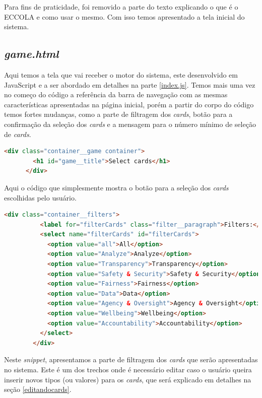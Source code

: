 Para fins de praticidade, foi removido a parte do texto explicando o que é o ECCOLA e como usar o mesmo. Com isso temos apresentado a tela inicial do sistema.

\subsection{\textit{game.html}}
\label{game.html}
Aqui temos a tela que vai receber o motor do sistema, este desenvolvido em JavaScript e a ser abordado em detalhes na parte \ref{index.js}. Temos mais uma vez no começo do código a referência da barra de navegação com as mesmas características apresentadas na página inicial, porém a partir do corpo do código temos fortes mudanças, como a parte de filtragem dos \textit{cards}, botão para a confirmação da seleção dos \textit{cards} e a mensagem para o número mínimo de seleção de \textit{cards}.

\begin{lstlisting}[language=html, caption=Seleção dos \textit{cards}.]
      <div class="container__game container">
        <h1 id="game__title">Select cards</h1>
      </div>
\end{lstlisting}
Aqui o código que simplesmente mostra o botão para a seleção dos \textit{cards} escolhidas pelo usuário.

\begin{lstlisting}[language=html, caption=Filtro dos \textit{cards}.]
        <div class="container__filters">
          <label for="filterCards" class="filter__paragraph">Filters:</label>
          <select name="filterCards" id="filterCards">
            <option value="all">All</option>
            <option value="Analyze">Analyze</option>
            <option value="Transparency">Transparency</option>
            <option value="Safety & Security">Safety & Security</option>
            <option value="Fairness">Fairness</option>
            <option value="Data">Data</option>
            <option value="Agency & Oversight">Agency & Oversight</option>
            <option value="Wellbeing">Wellbeing</option>
            <option value="Accountability">Accountability</option>
          </select>
        </div>
\end{lstlisting}
Neste \textit{snippet}, apresentamos a parte de filtragem dos \textit{cards} que serão apresentadas no sistema. Este é um dos trechos onde é necessário editar caso o usuário queira inserir novos tipos (ou valores) para os \textit{cards}, que será explicado em detalhes na seção \ref{editandocards}.


